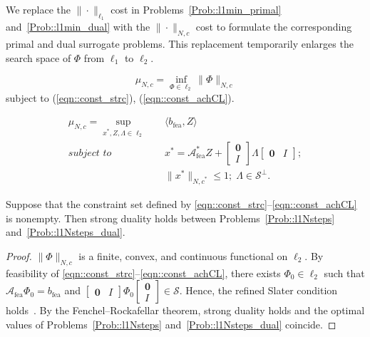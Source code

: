 We replace the \(\|\cdot\|_{\ell_1}\) cost in Problems~\ref{Prob::l1min_primal} and~\ref{Prob::l1min_dual} with the \(\|\cdot\|_{N,c}\) cost to formulate the corresponding primal and dual surrogate problems. This replacement temporarily enlarges the search space of \(\Phi\) from \(\ell_1\) to \(\ell_2\).
\begin{opt}\label{Prob::l1Nsteps}
\begin{equation}
    \mu_{N,c} =\underset{\Phi\in\ell_2}{\inf} \|\Phi\|_{N,c} 
\end{equation}
subject to (\ref{eqn::const_strc}),  (\ref{eqn::const_achCL}).
\end{opt}

\begin{opt}\label{Prob::l1Nsteps_dual}
\begin{subequations}
\begin{align}
\mu_{N,c} =\underset{x^*, Z, \Lambda\in \ell_2}{\sup} \quad & \langle b_{\mathrm{fea}}, Z \rangle\\
\textit{subject to} 
\quad & x^* = \mathcal{A}_{\mathrm{fea}}^* Z + \begin{bmatrix}
    \mathbf{0} \\ I
\end{bmatrix} \Lambda \begin{bmatrix}
    \mathbf{0} & I
\end{bmatrix};\\
& \|x^*\|_{{N,c}^*} \leq 1;\; \Lambda \in \mathcal{S}^\perp.
\end{align}
\end{subequations}
\end{opt}

\begin{prop}
Suppose that the constraint set defined by \eqref{eqn::const_strc}--\eqref{eqn::const_achCL} is nonempty.
Then strong duality holds between Problems~\ref{Prob::l1Nsteps} and~\ref{Prob::l1Nsteps_dual}.
\end{prop}
\begin{proof}
$\|\Phi\|_{N,c}$ is a finite, convex, and continuous functional on $\ell_2$.
By feasibility of \eqref{eqn::const_strc}--\eqref{eqn::const_achCL}, there exists $\Phi_0\in\ell_2$ such that
$\mathcal{A}_{\mathrm{fea}}\Phi_0 = b_{\mathrm{fea}}$ and $\begin{bmatrix}\mathbf 0 & I\end{bmatrix}\Phi_0 \begin{bmatrix} \mathbf 0 \\ I\end{bmatrix}\in\mathcal S$.
Hence, the refined Slater condition holds~\cite{Borwein2005convex}.
By the Fenchel--Rockafellar theorem, strong duality holds and the optimal values of
Problems~\ref{Prob::l1Nsteps} and~\ref{Prob::l1Nsteps_dual} coincide.
\end{proof}


